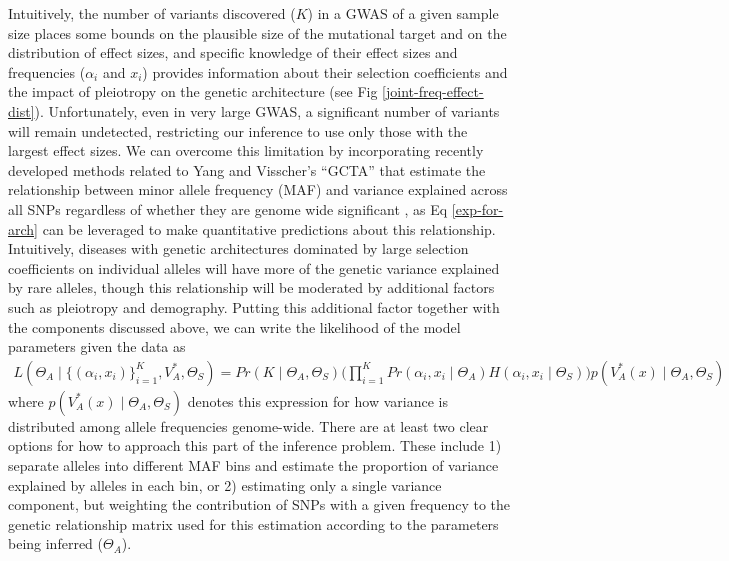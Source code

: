\documentclass[11pt]{article}
\begin{document}

Intuitively, the number of variants discovered ($K$) in a GWAS of a given sample size places some bounds on the plausible size of the mutational target and on the distribution of effect sizes, and specific knowledge of their effect sizes and frequencies ($\alpha_i$ and $x_i$) provides information about their selection coefficients and the impact of pleiotropy on the genetic architecture (see Fig \ref{joint-freq-effect-dist}). Unfortunately, even in very large GWAS, a significant number of variants will remain undetected, restricting our inference to use only those with the largest effect sizes. We can overcome this limitation by incorporating recently developed methods related to Yang and Visscher's ``GCTA''\cite{Yang:2011hd} that estimate the relationship between minor allele frequency (MAF) and variance explained across all SNPs regardless of whether they are genome wide significant \cite{Speed:2017ec, Evans:2017ce}, as Eq \eqref{exp-for-arch} can be leveraged to make quantitative predictions about this relationship. Intuitively, diseases with genetic architectures dominated by large selection coefficients on individual alleles will have more of the genetic variance explained by rare alleles, though this relationship will be moderated by additional factors such as pleiotropy and demography. Putting this additional factor together with the components discussed above, we can write the likelihood of the model parameters given the data as 
\begin{align*}
  L\left(\Theta_A \mid \{\left(\alpha_i, x_i\right)\}_{i=1}^K , V^*_A, \Theta_S\right) 
  = Pr\left(K \mid \Theta_A , \Theta_S \right) \Bigg( \prod_{i=1}^K Pr\left(\alpha_i , x_i \mid \Theta_A \right) H\left(\alpha_i , x_i \mid \Theta_S\right) \Bigg) p\left(V^*_A\left(x\right) \mid \Theta_A, \Theta_S \right)
\end{align*}
where $p\left(V_A^*\left(x\right) \mid \Theta_A , \Theta_S\right)$ denotes this expression for how variance is distributed among allele frequencies genome-wide. There are at least two clear options for how to approach this part of the inference problem. These include 1) separate alleles into different MAF bins and estimate the proportion of variance explained by alleles in each bin\cite{Lee:2012iu,Evans:2017ce}, or 2) estimating only a single variance component, but weighting the contribution of SNPs with a given frequency to the genetic relationship matrix used for this estimation according to the parameters being inferred ($\Theta_A$).
\end{document}
